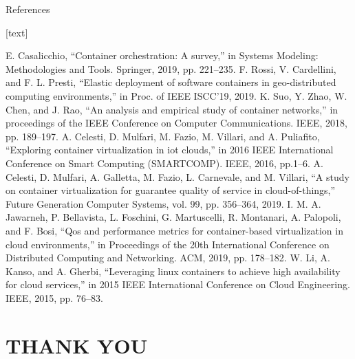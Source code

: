 \documentclass[UKenglish]{beamer}
\begin{document}
\begin{frame}[allowframebreaks]{References}
    \begin{thebibliography}{}

        

        [text]

          E. Casalicchio, “Container orchestration: A survey,” in Systems Modeling: Methodologies and Tools. Springer, 2019, pp. 221–235.
 F. Rossi, V. Cardellini, and F. L. Presti, “Elastic deployment of software
containers in geo-distributed computing environments,” in Proc. of IEEE
ISCC’19, 2019.
  K. Suo, Y. Zhao, W. Chen, and J. Rao, “An analysis and empirical
study of container networks,” in proceedings of the IEEE Conference
on Computer Communications. IEEE, 2018, pp. 189–197.
  A. Celesti, D. Mulfari, M. Fazio, M. Villari, and A. Puliafito, “Exploring
container virtualization in iot clouds,” in 2016 IEEE International Conference on Smart Computing (SMARTCOMP). IEEE, 2016, pp.1–6.
  A. Celesti, D. Mulfari, A. Galletta, M. Fazio, L. Carnevale, and
M. Villari, “A study on container virtualization for guarantee quality
of service in cloud-of-things,” Future Generation Computer Systems,
vol. 99, pp. 356–364, 2019.
  I. M. A. Jawarneh, P. Bellavista, L. Foschini, G. Martuscelli, R. Montanari, A. Palopoli, and F. Bosi, “Qos and performance metrics for
container-based virtualization in cloud environments,” in Proceedings
of the 20th International Conference on Distributed Computing and
Networking. ACM, 2019, pp. 178–182.
  W. Li, A. Kanso, and A. Gherbi, “Leveraging linux containers to
achieve high availability for cloud services,” in 2015 IEEE International
Conference on Cloud Engineering. IEEE, 2015, pp. 76–83.

    \end{thebibliography}
\end{frame}

\section{THANK YOU}
\SectionPage
\end{document}

